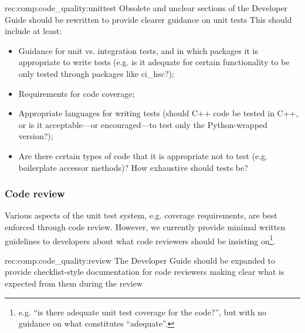 \begin{recommendation}
    {rec:comp:code_quality:unittest}
    {Obsolete and unclear sections of the Developer Guide should be rewritten to provide clearer guidance on unit tests}
    This should include at least:
\begin{itemize}

  \item{Guidance for unit vs. integration tests, and in which packages it is appropriate to write tests (e.g. is it adequate for certain functionality to be only tested through packages like ci\_hsc?);}
  \item{Requirements for code coverage;}
  \item{Appropriate languages for writing tests (should C++ code be tested in C++, or is it acceptable---or encouraged---to test only the Python-wrapped version?);}
  \item{Are there certain types of code that it is appropriate not to test (e.g. boilerplate accessor methods)? How exhaustive should tests be?}

\end{itemize}

\end{recommendation}

\subsubsection{Code review}
\label{sec:comp:code_quality:review}

Various aspects of the unit test system, e.g. coverage requirements, are best enforced through code review.
However, we currently provide minimal written guidelines to developers about what code reviewers should be insisting on\footnote{e.g. ``is there adequate unit test coverage for the code?'', but with no guidance on what constitutes ``adequate''.}.

\begin{recommendation}
    {rec:comp:code_quality:review}
    {The Developer Guide should be expanded to provide checklist-style documentation for code reviewers making clear what is expected from them
during the review}
\end{recommendation}

